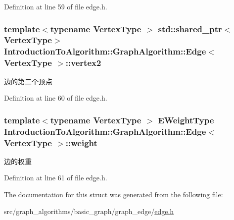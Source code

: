 Definition at line 59 of file edge.\+h.

\hypertarget{struct_introduction_to_algorithm_1_1_graph_algorithm_1_1_edge_a3bd2a73ca98edc0a6e38e7b4796b0c39}{}
\subsubsection[{vertex2}]{\setlength{\rightskip}{0pt plus 5cm}template$<$typename Vertex\+Type $>$ std\+::shared\+\_\+ptr$<$Vertex\+Type$>$ {\bf Introduction\+To\+Algorithm\+::\+Graph\+Algorithm\+::\+Edge}$<$ Vertex\+Type $>$\+::vertex2}\label{struct_introduction_to_algorithm_1_1_graph_algorithm_1_1_edge_a3bd2a73ca98edc0a6e38e7b4796b0c39}
边的第二个顶点 

Definition at line 60 of file edge.\+h.

\hypertarget{struct_introduction_to_algorithm_1_1_graph_algorithm_1_1_edge_a336f8a2aac3eb191fef304918ae859b1}{}
\subsubsection[{weight}]{\setlength{\rightskip}{0pt plus 5cm}template$<$typename Vertex\+Type $>$ {\bf E\+Weight\+Type} {\bf Introduction\+To\+Algorithm\+::\+Graph\+Algorithm\+::\+Edge}$<$ Vertex\+Type $>$\+::weight}\label{struct_introduction_to_algorithm_1_1_graph_algorithm_1_1_edge_a336f8a2aac3eb191fef304918ae859b1}
边的权重 

Definition at line 61 of file edge.\+h.



The documentation for this struct was generated from the following file\+:\begin{DoxyCompactItemize}
\item 
src/graph\+\_\+algorithms/basic\+\_\+graph/graph\+\_\+edge/\hyperlink{edge_8h}{edge.\+h}\end{DoxyCompactItemize}
